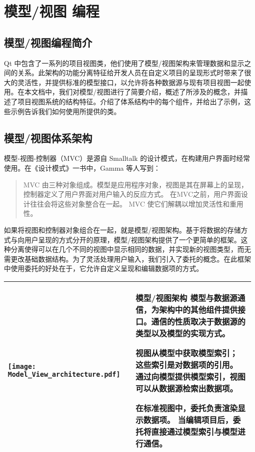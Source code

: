 \chapter{模型/视图 编程}

\section{模型/视图编程简介} 

Qt 中包含了一系列的项目视图类，他们使用了模型/视图架构来管理数据和显示之间的关系。此架构的功能分离特征给开发人员在自定义项目的呈现形式时带来了很大的灵活性，并提供标准的模型接口，以允许将各种数据源与现有项目视图一起使用。在本文档中，我们对模型/视图进行了简要介绍，概述了所涉及的概念，并描述了项目视图系统的结构特征。介绍了体系结构中的每个组件，并给出了示例，这些示例告诉我们如何使用所提供的类。


\section{模型/视图体系架构}

模型-视图-控制器（MVC）是源自 Smalltalk 的设计模式，在构建用户界面时经常使用。在《设计模式》一书中，Gamma 等人写到：


\begin{quote}
MVC 由三种对象组成。模型是应用程序对象，视图是其在屏幕上的呈现，控制器定义了用户界面对用户输入的反应方式。 在MVC之前，用户界面设计往往会将这些对象整合在一起。 MVC 使它们解耦以增加灵活性和重用性。	
\end{quote}

如果将视图和控制器对象组合在一起，就是模型/视图架构。基于将数据的存储方式与向用户呈现的方式分开的原理，模型/视图架构提供了一个更简单的框架。这种分离使得可以在几个不同的视图中显示相同的数据，并实现新的视图类型，而无需更改基础数据结构。为了灵活处理用户输入，我们引入了委托的概念。在此框架中使用委托的好处在于，它允许自定义呈现和编辑数据项的方式。

\begin{tabular}{|l|m{25em}|}
\hline
    \texttt{[image: Model\_View\_architecture.pdf]}
  & 模型/视图架构 模型与数据源通信，为架构中的其他组件提供接口。通信的性质取决于数据源的类型以及模型的实现方式。


视图从模型中获取模型索引； 这些索引是对数据项的引用。 通过向模型提供模型索引，视图可以从数据源检索出数据项。


在标准视图中，委托负责渲染显示数据项。 当编辑项目后，委托将直接通过模型索引与模型进行通信。\\

\hline	
\end{tabular}


